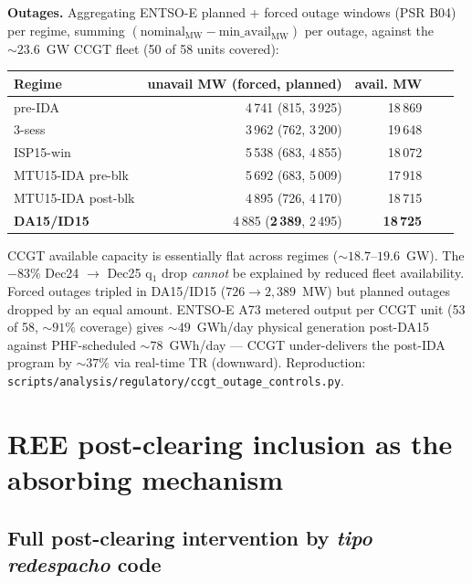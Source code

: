 \documentclass[11pt,a4paper]{article}
\begin{document}
\textbf{Outages.} Aggregating ENTSO-E planned + forced outage windows (PSR B04) per regime, summing $(\text{nominal}_{\text{MW}} - \text{min\_avail}_{\text{MW}})$ per outage, against the $\sim\!23.6$~GW CCGT fleet (50 of 58 units covered):

\begin{center}\scriptsize
\setlength{\tabcolsep}{4pt}
\begin{tabular}{l r r r r}
\toprule
Regime & unavail MW (forced, planned) & avail. MW \\
\midrule
pre-IDA            & 4\,741 (815, 3\,925)        & 18\,869 \\
3-sess             & 3\,962 (762, 3\,200)        & 19\,648 \\
ISP15-win          & 5\,538 (683, 4\,855)        & 18\,072 \\
MTU15-IDA pre-blk  & 5\,692 (683, 5\,009)        & 17\,918 \\
MTU15-IDA post-blk & 4\,895 (726, 4\,170)        & 18\,715 \\
\textbf{DA15/ID15} & 4\,885 (\textbf{2\,389}, 2\,495) & \textbf{18\,725} \\
\bottomrule
\end{tabular}
\end{center}

\noindent CCGT available capacity is essentially flat across regimes ($\sim\!18.7$--$19.6$~GW). The $-83\%$ Dec24 $\to$ Dec25 q$_1$ drop \emph{cannot} be explained by reduced fleet availability. Forced outages tripled in DA15/ID15 ($726 \to 2{,}389$~MW) but planned outages dropped by an equal amount. ENTSO-E A73 metered output per CCGT unit (53 of 58, $\sim\!91\%$ coverage) gives $\sim\!49$~GWh/day physical generation post-DA15 against PHF-scheduled $\sim\!78$~GWh/day --- CCGT under-delivers the post-IDA program by $\sim\!37\%$ via real-time TR (downward). Reproduction: \texttt{scripts/analysis/regulatory/ccgt\_outage\_controls.py}.

\section{REE post-clearing inclusion as the absorbing mechanism}\label{sec:prov:phf_minus_pdbf}

\subsection{Full post-clearing intervention by \emph{tipo redespacho} code}\label{sec:prov:phf_minus_pdbf:fullview}
\end{document}
